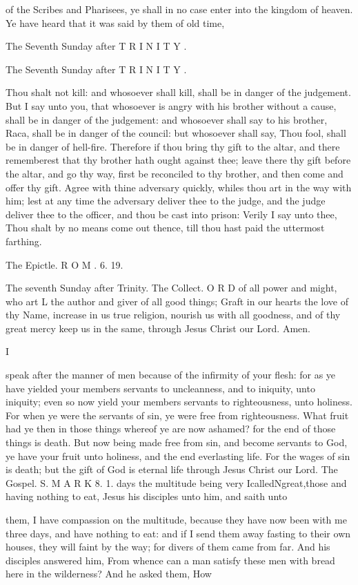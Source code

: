 of the Scribes and Pharisees, ye shall in no case enter into the kingdom of heaven. Ye have heard that it was said by them of old time,

The Seventh Sunday after T R I N I T Y .

The Seventh Sunday after T R I N I T Y .

Thou shalt not kill: and whosoever shall kill, shall be in danger of the judgement. But I say unto you, that whosoever is angry with his brother without a cause, shall be in danger of the judgement: and whosoever shall say to his brother, Raca, shall be in danger of the council: but whosoever shall say, Thou fool, shall be in danger of hell-fire. Therefore if thou bring thy gift to the altar, and there rememberest that thy brother hath ought against thee; leave there thy gift before the altar, and go thy way, first be reconciled to thy brother, and then come and offer thy gift. Agree with thine adversary quickly, whiles thou art in the way with him; lest at any time the adversary deliver thee to the judge, and the judge deliver thee to the officer, and thou be cast into prison: Verily I say unto thee, Thou shalt by no means come out thence, till thou hast paid the uttermost farthing.

The Epictle. R O M . 6. 19.

The seventh Sunday after Trinity. The Collect. O R D of all power and might, who art L the author and giver of all good things; Graft in our hearts the love of thy Name, increase in us true religion, nourish us with all goodness, and of thy great mercy keep us in the same, through Jesus Christ our Lord. Amen.

I

speak after the manner of men because of the infirmity of your flesh: for as ye have yielded your members servants to uncleanness, and to iniquity, unto iniquity; even so now yield your members servants to righteousness, unto holiness. For when ye were the servants of sin, ye were free from righteousness. What fruit had ye then in those things whereof ye are now ashamed? for the end of those things is death. But now being made free from sin, and become servants to God, ye have your fruit unto holiness, and the end everlasting life. For the wages of sin is death; but the gift of God is eternal life through Jesus Christ our Lord. The Gospel. S. M A R K 8. 1. days the multitude being very IcalledNgreat,those and having nothing to eat, Jesus his disciples unto him, and saith unto

them, I have compassion on the multitude, because they have now been with me three days, and have nothing to eat: and if I send them away fasting to their own houses, they will faint by the way; for divers of them came from far. And his disciples answered him, From whence can a man satisfy these men with bread here in the wilderness? And he asked them, How

